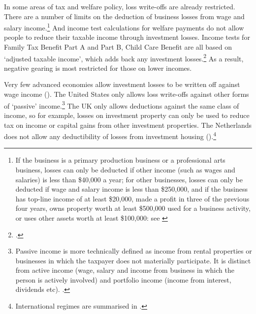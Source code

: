 In some areas of tax and welfare policy, loss write-offs are already restricted. 
There are a number of limits on the deduction of business losses from wage and salary income.\footnote{If the business is a primary production business or a professional arts business, losses can only be deducted if other income (such as wages and salaries) is less than \$40,000 a year; for other businesses, losses can only be deducted if wage and salary income is less than \$250,000, and if the business has top-line income of at least \$20,000, made a profit in three of the previous four years, owns property worth at least \$500,000 used for a business activity, or uses other assets worth at least \$100,000: see \textcite{ATO2015OffsettingCurrentYearLosses}}
And income test calculations for welfare payments do not allow people to reduce their taxable income through investment losses. Income tests for Family Tax Benefit Part A and Part B, Child Care Benefit are all based on ‘adjusted taxable income’, which adds back any investment losses.\footcite{DHS2015AdjustedTaxableIncome} 
As a result, negative gearing is most restricted for those on lower incomes.

Very few advanced economies allow investment losses to be written off against wage income (). 
The United States only allows loss write-offs against other forms of ‘passive’ income.\footnote{Passive income\label{footnote:passive-income} is more technically defined as income from rental properties or businesses in which the taxpayer does not materially participate. It is distinct from active income (wage, salary and income from business in which the person is actively involved) and portfolio income (income from interest, dividends etc). \textcite[See:][]{IRS2015}.} 
The UK only allows deductions against the same class of income, so for example, losses on investment property can only be used to reduce tax on income or capital gains from other investment properties. 
The Netherlands does not allow any deductibility of losses from investment housing ().\footnote{International regimes are summarised in \textcites[][43]{RBA2014SubmissionAffordableHousingInquiry}[][86]{ProductivityCommission2004FirstHomeOwnership}[][92--95]{ODonnell2005}.}

